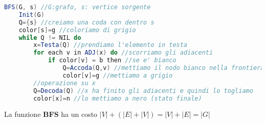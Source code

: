 \begin{lstlisting}[language=Java]
BFS(G, s) //G:grafo, s: vertice sorgente
    Init(G)
    Q={s} //creiamo una coda con dentro s 
    color[s]=g //coloriamo di grigio 
    while Q != NIL do 
        x=Testa(Q) //prendiamo l'elemento in testa 
        for each v in ADJ(x) do //scorriamo gli adiacenti
            if color[v] = b then //se e' bianco 
                Q=Accoda(Q,v) //mettiamo il nodo bianco nella frontiera 
                color[v]=g //mettiamo a grigio 
        //operazione su x
        Q=Decoda(Q) //x ha finito gli adiacenti e quindi lo togliamo
        color[x]=n //lo mettiamo a nero (stato finale)
\end{lstlisting}
La funzione \textbf{BFS} ha un costo $|V| + (|E|+|V|) = |V|+|E|=|G|$
    